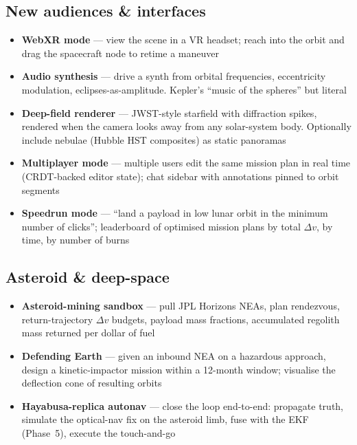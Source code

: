 \documentclass[11pt, a4paper]{article}
\begin{document}
\subsection{New audiences \& interfaces}

\begin{itemize}[leftmargin=*]
  \item \textbf{WebXR mode} --- view the scene in a VR headset; reach
        into the orbit and drag the spacecraft node to retime a maneuver
  \item \textbf{Audio synthesis} --- drive a synth from orbital
        frequencies, eccentricity modulation, eclipses-as-amplitude.
        Kepler's ``music of the spheres'' but literal
  \item \textbf{Deep-field renderer} --- JWST-style starfield with
        diffraction spikes, rendered when the camera looks away from any
        solar-system body. Optionally include nebulae (Hubble HST
        composites) as static panoramas
  \item \textbf{Multiplayer mode} --- multiple users edit the same
        mission plan in real time (CRDT-backed editor state); chat
        sidebar with annotations pinned to orbit segments
  \item \textbf{Speedrun mode} --- ``land a payload in low lunar orbit
        in the minimum number of clicks''; leaderboard of optimised
        mission plans by total $\Delta v$, by time, by number of burns
\end{itemize}

\subsection{Asteroid \& deep-space}

\begin{itemize}[leftmargin=*]
  \item \textbf{Asteroid-mining sandbox} --- pull JPL Horizons NEAs,
        plan rendezvous, return-trajectory $\Delta v$ budgets, payload
        mass fractions, accumulated regolith mass returned per dollar
        of fuel
  \item \textbf{Defending Earth} --- given an inbound NEA on a hazardous
        approach, design a kinetic-impactor mission within a 12-month
        window; visualise the deflection cone of resulting orbits
  \item \textbf{Hayabusa-replica autonav} --- close the loop end-to-end:
        propagate truth, simulate the optical-nav fix on the asteroid
        limb, fuse with the EKF (Phase~5), execute the touch-and-go
\end{itemize}
\end{document}

